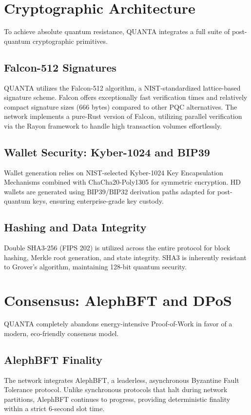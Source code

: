 \documentclass[11pt,a4paper]{article}
\begin{document}
\section{Cryptographic Architecture}
To achieve absolute quantum resistance, QUANTA integrates a full suite of post-quantum cryptographic primitives.

\subsection{Falcon-512 Signatures}
QUANTA utilizes the Falcon-512 algorithm, a NIST-standardized lattice-based signature scheme. Falcon offers exceptionally fast verification times and relatively compact signature sizes (666 bytes) compared to other PQC alternatives. The network implements a pure-Rust version of Falcon, utilizing parallel verification via the Rayon framework to handle high transaction volumes effortlessly.

\subsection{Wallet Security: Kyber-1024 and BIP39}
Wallet generation relies on NIST-selected Kyber-1024 Key Encapsulation Mechanisms combined with ChaCha20-Poly1305 for symmetric encryption. HD wallets are generated using BIP39/BIP32 derivation paths adapted for post-quantum keys, ensuring enterprise-grade key custody.

\subsection{Hashing and Data Integrity}
Double SHA3-256 (FIPS 202) is utilized across the entire protocol for block hashing, Merkle root generation, and state integrity. SHA3 is inherently resistant to Grover's algorithm, maintaining 128-bit quantum security.

\section{Consensus: AlephBFT and DPoS}
QUANTA completely abandons energy-intensive Proof-of-Work in favor of a modern, eco-friendly consensus model.

\subsection{AlephBFT Finality}
The network integrates AlephBFT, a leaderless, asynchronous Byzantine Fault Tolerance protocol. Unlike synchronous protocols that halt during network partitions, AlephBFT continues to progress, providing deterministic finality within a strict 6-second slot time. 
\end{document}
